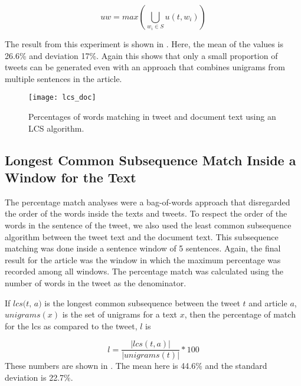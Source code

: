 \begin{equation}
uw = max \left( \bigcup_{w_i \in S} u \left( t, w_i \right) \right)
\end{equation}

The result from this experiment is shown in . Here, the mean of the values is 26.6\% and deviation 17\%. Again this shows that only a small proportion of tweets can be generated even with an approach that combines unigrams from multiple sentences in the article.


\begin{figure}[tbp]
\centering
\texttt{[image: lcs\_doc]}
\caption{Percentages of words matching in tweet and document text using an LCS algorithm.}
\label{fig:lcs}
\end{figure}


\subsection{Longest Common Subsequence Match Inside a Window for the Text}
\label{sec:lcs}

The percentage match analyses were a bag-of-words approach that disregarded the order of the words inside the texts and tweets. To respect the order of the words in the sentence of the tweet, we also used the least common subsequence algorithm between the tweet text and the document text. This subsequence matching was done inside a sentence window of 5 sentences. 
Again, the final result for the article was the window in which the maximum percentage was recorded among all windows. The percentage match was calculated using the number of words in the tweet as the denominator.

If $\textit{lcs(t, a)}$ is the longest common subsequence between the tweet $t$ and article $a$, $\textit{unigrams}(x)$ is the set of unigrams for a text $x$, then the percentage of match for the lcs as compared to the tweet, $\textit{l}$ is

\begin{equation}
l = \frac{| lcs(t, a) |}{| unigrams(t) |} * 100
\end{equation}
 These numbers are shown in . The mean here is 44.6\% and the standard deviation is 22.7\%. 



